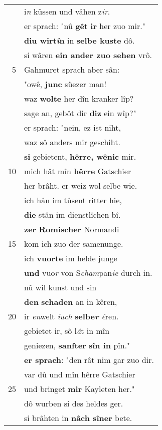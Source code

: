 \documentclass[8pt,a4paper,notitlepage]{article}
\begin{document}
\begin{table}[ht]
\begin{minipage}[t]{0.5\linewidth}
\begin{center}
\end{center}
\begin{tabular}{rl}
 & i\textit{n} küssen und vâhen z\textit{ir}.\\ 
 & er sprach: "nû \textbf{gêt} \textbf{ir} her zuo mir."\\ 
 & \textbf{diu wirt\textit{î}n} in \textbf{selbe kuste} dô.\\ 
 & si wâren \textbf{ein ander zuo sehen} vrô.\\ 
5 & Gahmuret sprach aber sân:\\ 
 & "owê, \textbf{junc} süezer man!\\ 
 & waz \textbf{wolte} her dîn kranker lîp?\\ 
 & sage an, gebôt dir \textbf{diz} ein wîp?"\\ 
 & er sprach: "nein, ez ist niht,\\ 
 & waz sô anders mir geschiht.\\ 
 & \textbf{si} gebietent, \textbf{hêrre, wênic} mir.\\ 
10 & mich hât mîn \textbf{hêrre} Gatschier\\ 
 & her brâht. er weiz wol selbe wie.\\ 
 & ich hân im tûsent ritter hie,\\ 
 & \textbf{die} stân im dienstlîchen bî.\\ 
 & \textbf{zer} \textbf{Romischer} Normandi\\ 
15 & kom ich zuo der samenunge.\\ 
 & ich \textbf{vuorte} im helde junge\\ 
 & \textbf{und} vuo\textit{r} von S\textit{cham}pan\textit{ie} durch in.\\ 
 & nû wil kunst und sin\\ 
 & \textbf{den} \textbf{schaden} an in kêren,\\ 
20 & ir \textit{en}welt \textit{iuch} \textbf{selbe\textit{r}} \textit{ê}ren.\\ 
 & gebietet ir, sô l\textit{â}t in mîn\\ 
 & geniezen, \textbf{sanfter} \textbf{sîn in} pîn."\\ 
 & \textbf{er sprach}: "den rât nim gar zuo dir.\\ 
 & var dû und mîn hêrre Gatschier\\ 
25 & und bringet \textbf{mir} Kayleten her."\\ 
 & dô wurben si des heldes ger.\\ 
 & si brâhten in \textbf{nâch sîner} bete.\\ 

\end{tabular}
\end{minipage}
\end{table}
\end{document}
